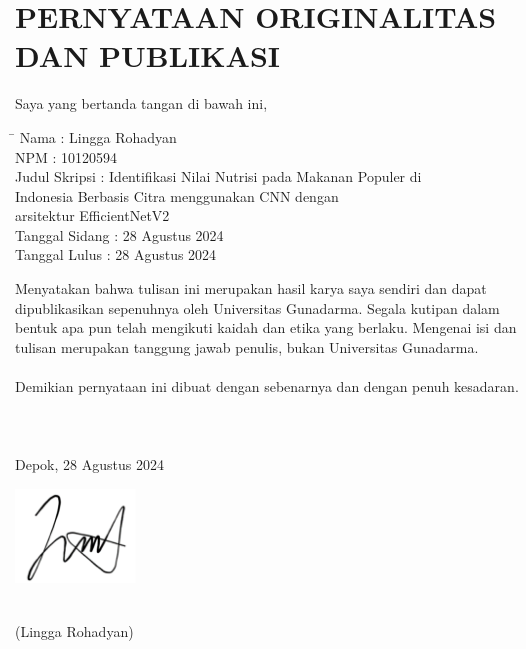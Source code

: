 \chapter*{PERNYATAAN ORIGINALITAS DAN PUBLIKASI}

\noindent
Saya yang bertanda tangan di bawah ini,\\
\begin{tabbing}
\hspace{4cm} \= \kill
Nama \>: Lingga Rohadyan \\
NPM \>: 10120594 \\
Judul Skripsi \>: Identifikasi Nilai Nutrisi pada Makanan Populer di\\
 \> Indonesia Berbasis Citra menggunakan CNN dengan \\
 \> arsitektur EfficientNetV2 \\
Tanggal Sidang \>: 28 Agustus 2024\\
Tanggal Lulus \>: 28 Agustus 2024\\
\end{tabbing}
Menyatakan bahwa tulisan ini merupakan hasil karya saya sendiri dan dapat dipublikasikan sepenuhnya oleh Universitas Gunadarma. Segala kutipan dalam bentuk apa pun telah mengikuti kaidah dan etika yang berlaku. Mengenai isi dan tulisan merupakan tanggung jawab penulis, bukan Universitas Gunadarma. \\ \\
Demikian pernyataan ini dibuat dengan sebenarnya dan dengan penuh kesadaran.
\\
\\
\\
\\
Depok, 28 Agustus 2024 \\
\begin{afigure}
\includegraphics[height=2.5cm, left]{images/ttd.png}
\end{afigure} \\
(Lingga Rohadyan)

\pagebreak
